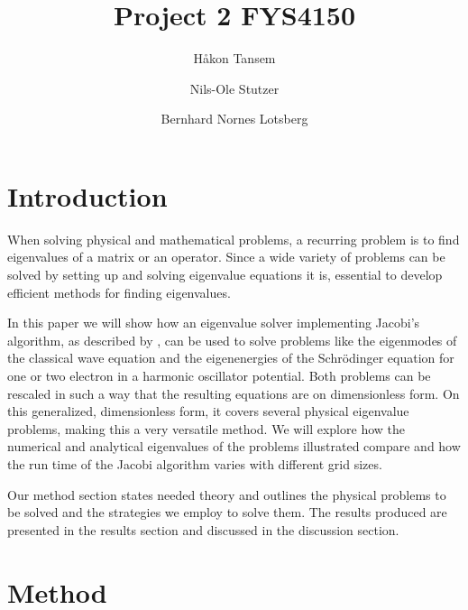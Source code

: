 \documentclass[twocolumn]{aastex62}
\begin{document}
\title{Project 2 FYS4150}

\author{Håkon Tansem}

\author{Nils-Ole Stutzer}

\author{Bernhard Nornes Lotsberg}

\begin{abstract}

\end{abstract}

\section{Introduction} \label{sec:intro}
When solving physical and mathematical problems, a recurring problem is to find eigenvalues of a matrix or an operator. Since a wide variety of problems can be solved by setting up and solving eigenvalue equations it is, essential to develop efficient methods for finding eigenvalues. 

In this paper we will show how an eigenvalue solver implementing Jacobi's algorithm, as described by \citep[Ch. 7.4]{Jensen:2015}, can be used to solve problems like the eigenmodes of the classical wave equation and the eigenenergies of the Schrödinger equation for one or two electron in a harmonic oscillator potential. Both problems can be rescaled in such a way that the resulting equations are on dimensionless form. On this generalized, dimensionless form, it covers several physical eigenvalue problems, making this a very versatile method. We will explore how the numerical and analytical eigenvalues of the problems illustrated compare and how the run time of the Jacobi algorithm varies with different grid sizes.

Our method section states needed theory and outlines the physical problems to be solved and the strategies we employ to solve them. The results produced are presented in the results section and discussed in the discussion section.   

\section{Method} \label{sec:method}
\end{document}
